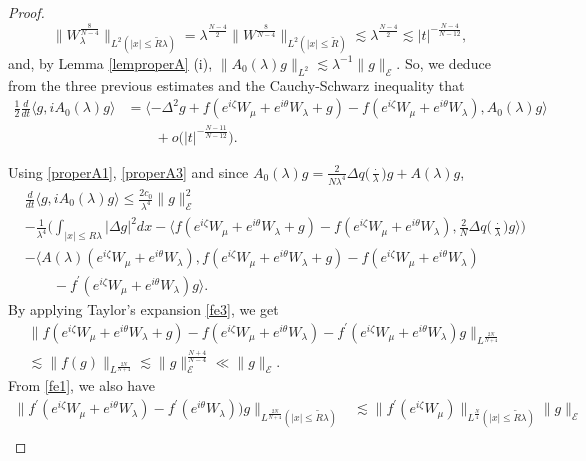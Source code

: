 \documentclass[10pt,a4paper]{amsart}
\begin{document}
\begin{proof}
$$\|W_\lambda^{\frac{8}{N-4}}\|_{L^2 (|x|\leq \tilde{R} \lambda)}=\lambda^{\frac{N-4}{2}} \|W^{\frac{8}{N-4}}\|_{L^2 (|x|\leq \tilde{R})}\lesssim \lambda^{\frac{N-4}{2}}\lesssim |t|^{-\frac{N-4}{N-12}},$$
and, by Lemma \ref{lemproperA} (i),
 $\|A_0 (\lambda) g\|_{L^2} \lesssim \lambda^{-1}\|g\|_{\mathcal{E}}.$
So, we deduce from the three previous estimates and the Cauchy-Schwarz inequality that
\begin{align*}
\frac{1}{2} \frac{d}{dt} \langle g, i A_0 (\lambda) g\rangle & = \langle - \Delta^2 g + f(e^{i\zeta}W_\mu +e^{i\theta} W_\lambda +g   )-   f(e^{i\zeta}W_\mu +e^{i\theta} W_\lambda ) , A_0 (\lambda )g \rangle\\
&\qquad
+o\big(|t|^{-\frac{N-11}{N-12}}\big) .
\end{align*}

Using \eqref{properA1}, \eqref{properA3} and since $A_0 (\lambda) g = \frac{2}{N\lambda^4}\Delta q \big(\frac{\cdot}{\lambda}\big) g +A(\lambda ) g$,
\begin{align*}
&\frac{d}{dt} \big\langle g, i A_0 (\lambda) g\big\rangle 
\leq \frac{2c_0}{\lambda^4} \|g\|_{\mathcal{E}}^2\\
&- \frac{1}{\lambda^4} \Big(\int_{|x|\leq R\lambda} |\Delta g|^2 dx -\big\langle f(e^{i\zeta}W_\mu +e^{i\theta} W_\lambda +g) - f(e^{i\zeta} W_\mu +e^{i\theta} W_\lambda), \frac{2}{N} \Delta q \big(\frac{\cdot}{\lambda} \big) g\big\rangle  \Big) \\
&-\big\langle A(\lambda) (e^{i\zeta} W_\mu +e^{i\theta} W_\lambda), f (e^{i\zeta} W_\mu +e^{i\theta} W_\lambda+g) - f(e^{i\zeta} W_\mu +e^{i\theta} W_\lambda)\\
&\qquad - f^\prime (e^{i\zeta} W_\mu +e^{i\theta} W_\lambda)g\big\rangle .
\end{align*}
By applying Taylor's expansion \eqref{fe3}, we get 
\begin{align*}
& \| f (e^{i\zeta}W_\mu +e^{i\theta} W_\lambda +g) - f (e^{i\zeta} W_\mu +e^{i\theta} W_\lambda )  - f^\prime (e^{i\zeta} W_\mu +e^{i\theta} W_\lambda) g \|_{L^{\frac{2N}{N+4}}}\\
& \lesssim \|f(g) \|_{L^{\frac{2N}{N+4}}}  \lesssim  \|g\|_{\mathcal{E}}^{\frac{N+4}{N-4}} \ll \|g \|_{\mathcal{E}}.
\end{align*}
From \eqref{fe1}, we also have
\begin{align*}
\|f^\prime (e^{i\zeta} W_\mu +e^{i\theta} W_\lambda) - f^\prime (e^{i\theta} W_\lambda))g \|_{L^{\frac{2N}{N+4}}(|x| \leq \tilde{R} \lambda) } & \lesssim \|f^\prime (e^{i\zeta} W_\mu)\|_{L^{\frac{N}{4}} (|x|\leq \tilde{R} \lambda)} \|g\|_{\mathcal{E}}\\

\end{align*}
\end{proof}
\end{document}
